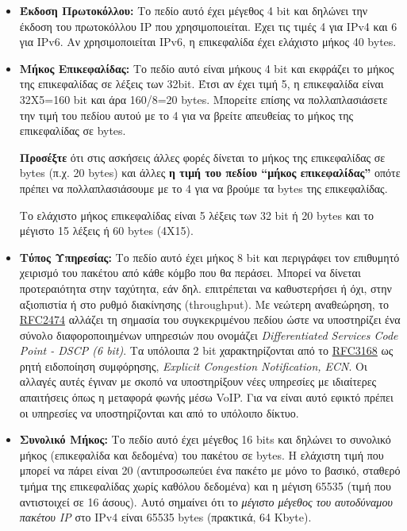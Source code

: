\begin{itemize}
\item \textbf{Έκδοση Πρωτοκόλλου:} Το πεδίο αυτό έχει μέγεθος 4 bit και δηλώνει την έκδοση του πρωτοκόλλου IP που χρησιμοποιείται. Έχει τις τιμές 4 για IPv4 και 6 για IPv6. Αν χρησιμοποιείται IPv6, η επικεφαλίδα έχει ελάχιστο μήκος 40 bytes.
\item \textbf{Μήκος Επικεφαλίδας:} Το πεδίο αυτό είναι μήκους 4 bit και εκφράζει το μήκος της επικεφαλίδας σε λέξεις των 32bit. Έτσι αν έχει τιμή 5, η επικεφαλίδα είναι 32Χ5=160 bit και άρα 160/8=20 bytes. Μπορείτε επίσης να πολλαπλασιάσετε την τιμή του πεδίου αυτού με το 4 για να βρείτε απευθείας το μήκος της επικεφαλίδας σε bytes.

\begin{inthebox}
\textbf{Προσέξτε} ότι στις ασκήσεις άλλες φορές δίνεται το μήκος της επικεφαλίδας σε bytes (π.χ. 20 bytes) και άλλες \textbf{η τιμή του πεδίου ``μήκος επικεφαλίδας''} οπότε πρέπει να πολλαπλασιάσουμε με το 4 για να βρούμε τα bytes της επικεφαλίδας.\\
\end{inthebox}

Το ελάχιστο μήκος επικεφαλίδας είναι 5 λέξεις των 32 bit ή 20 bytes και το μέγιστο 15 λέξεις ή 60 bytes (4X15).
\item \textbf{Τύπος Υπηρεσίας:} Το πεδίο αυτό έχει μήκος 8 bit και περιγράφει τον επιθυμητό χειρισμό του πακέτου από κάθε κόμβο που θα περάσει. Μπορεί να δίνεται προτεραιότητα στην ταχύτητα, εάν δηλ. επιτρέπεται να καθυστερήσει ή όχι, στην αξιοπιστία ή στο ρυθμό διακίνησης (throughput). Με νεώτερη αναθεώρηση, το \href{https://tools.ietf.org/html/rfc2474}{RFC2474} αλλάζει τη σημασία του συγκεκριμένου πεδίου ώστε να υποστηρίζει ένα σύνολο διαφοροποιημένων υπηρεσιών που ονομάζει \emph{Differentiated Services Code Point - DSCP (6 bit)}. Τα υπόλοιπα 2 bit χαρακτηρίζονται από το \href{https://tools.ietf.org/html/rfc3168}{RFC3168}  ως ρητή ειδοποίηση συμφόρησης, \emph{Explicit Congestion Notification, ECN}. Οι αλλαγές αυτές έγιναν με σκοπό να υποστηρίξουν νέες υπηρεσίες με ιδιαίτερες απαιτήσεις όπως η μεταφορά φωνής μέσω VoIP. Για να είναι αυτό εφικτό πρέπει οι υπηρεσίες να υποστηρίζονται και από το υπόλοιπο δίκτυο. 

\item \textbf{Συνολικό Μήκος:} Το πεδίο αυτό έχει μέγεθος 16 bits και δηλώνει το συνολικό μήκος (επικεφαλίδα και δεδομένα) του πακέτου σε bytes. Η ελάχιστη τιμή που μπορεί να πάρει είναι 20 (αντιπροσωπεύει ένα πακέτο με μόνο το βασικό, σταθερό τμήμα της επικεφαλίδας χωρίς καθόλου δεδομένα) και η μέγιση 65535 (τιμή που αντιστοιχεί σε 16 άσους). Αυτό σημαίνει ότι το \emph{μέγιστο μέγεθος του αυτοδύναμου πακέτου IP} στο IPv4 είναι 65535 bytes (πρακτικά, 64 Kbyte).


\end{itemize}
